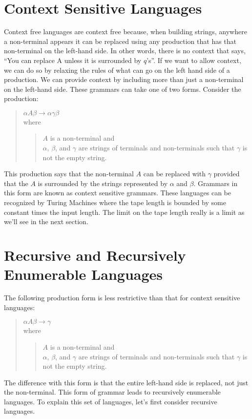 \documentclass[letterpaper,12pt,openany,reqno]{book}%
\begin{document}
\section {Context Sensitive Languages}
Context free languages are context free because, when building strings, anywhere a non-terminal appears it can be replaced using any production that has that non-terminal on the left-hand side. In other words, there is no context that says, ``You can replace A unless it is surrounded by $q$'s''. If we want to allow context, we can do so by relaxing the rules of what can go on the left hand side of a production. We can provide context by including more than just a non-terminal on the left-hand side. These grammars can take one of two forms. Consider the production:
\begin{quote}
$\alpha A \beta \rightarrow \alpha \gamma \beta$\\
where 
\begin{quote}
$A$ is a non-terminal and\\
$\alpha$, $\beta$, and $\gamma$ are strings of terminals and non-terminals such that $\gamma$ is not the empty string.
\end{quote}
\end{quote}
This production says that the non-terminal $A$ can be replaced with $\gamma$ provided that the $A$ is surrounded by the strings represented by $\alpha$ and $\beta$. Grammars in this form are known as context sensitive grammars. These languages can be recognized by Turing Machines where the tape length is bounded by some constant times the input length. The limit on the tape length really is a limit as we'll see in the next section.

\section{Recursive and Recursively Enumerable Languages}
The following production form is less restrictive than that for context sensitive languages:
\begin{quote}
$\alpha A \beta \rightarrow \gamma$\\
where 
\begin{quote}
$A$ is a non-terminal and\\
$\alpha$, $\beta$, and $\gamma$ are strings of terminals and non-terminals such that $\gamma$ is not the empty string.
\end{quote}
\end{quote}
The difference with this form is that the entire left-hand side is replaced, not just the non-terminal. This form of grammar leads to recursively enumerable languages. To explain this set of languages, let's first consider recursive languages.
\end{document}
